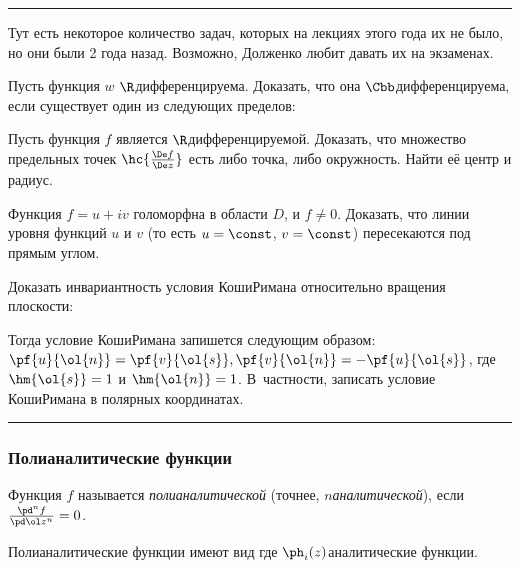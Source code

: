 \documentclass[a4paper]{article}
\newenvironment{petit}
{\par \smallskip \hrule \smallskip \footnotesize}
{\par \smallskip \hrule \smallskip}
\begin{document}
\begin{petit}
Тут есть некоторое количество задач, которых на лекциях этого года их не было, но они были 2 года назад.
Возможно, Долженко любит давать их на экзаменах.

\medskip

\begin{problem}
Пусть функция $w$ $\R$\д дифференцируема.
Доказать, что она $\Cbb$\д дифференцируема, если существует один из следующих пределов:
\end{problem}

\begin{problem}
Пусть функция $f$ является $\R$\д дифференцируемой.
Доказать, что множество предельных точек $\hc{\frac{\De f}{\De z}}$ есть либо точка, либо окружность.
Найти её центр и радиус.
\end{problem}

\begin{problem}
Функция $f = u + iv$ голоморфна в области $D$, и $f \neq 0$. Доказать, что линии уровня функций $u$ и $v$
(то есть $u=\const$, $v=\const$) пересекаются под прямым углом.
\end{problem}

\begin{problem}
Доказать инвариантность условия Коши\ч Римана относительно вращения плоскости:

Тогда условие Коши\ч Римана запишется следующим образом:
$\pf{u}{\ol{n}} = \pf{v}{\ol{s}},\pf{v}{\ol{n}} = - \pf{u}{\ol{s}}$, где $\hm{\ol{s}} = 1$ и $\hm{\ol{n}} = 1$.
В~частности, записать условие Коши\ч Римана в полярных координатах.
\end{problem}
\end{petit}

\subsubsection{Полианалитические функции}

\begin{df}
Функция $f$ называется \emph{полианалитической} (точнее, \emph{$n$\д аналитической}), если $\frac{\pd^n f}{\pd \ol z^n} = 0$.
\end{df}

Полианалитические функции имеют вид
где $\ph_i(z)$\т аналитические функции.
\end{document}

